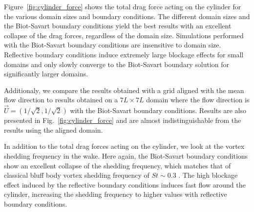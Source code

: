 \documentclass[preprint,12pt]{elsarticle}
\begin{document}
Figure~\ref{fig:cylinder_force} shows the total drag force acting on the cylinder for the various domain sizes and boundary conditions. The different domain sizes and the Biot-Savart boundary conditions yield the best results with an excellent collapse of the drag forces, regardless of the domain size. Simulations performed with the Biot-Savart boundary conditions are insensitive to domain size. Reflective boundary conditions induce extremely large blockage effects for small domains and only slowly converge to the Biot-Savart boundary solution for significantly larger domains.

Additionaly, we compare the results obtained with a grid aligned with the mean flow direction to results obtained on a $7L\times 7L$ domain where the flow direction is $\vec{U}=(1/\sqrt{2},1/\sqrt{2})$ with the Biot-Savart boundary conditions. Results are also presented in Fig.~\ref{fig:cylinder_force} and are almost indistinguishable from the results using the aligned domain.


In addition to the total drag forces acting on the cylinder, we look at the vortex shedding frequency in the wake. Here again, the Biot-Savart boundary conditions show an excellent collapse of the shedding frequency, which matches that of classical bluff body vortex shedding frequency of $St\sim 0.3$ \cite{}. The high blockage effect induced by the reflective boundary conditions induces fast flow around the cylinder, increasing the shedding frequency to higher values with reflective boundary conditions.
\end{document}
